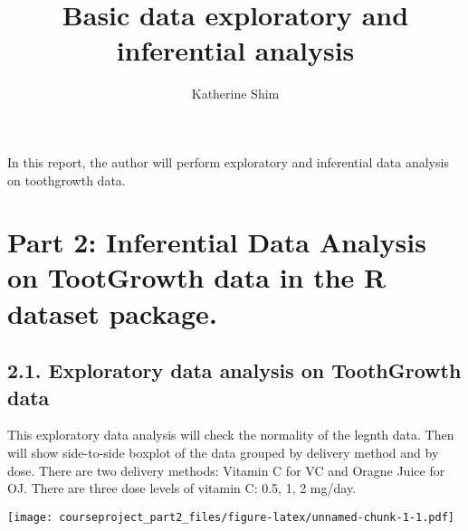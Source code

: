 \documentclass[]{article}
\title{Basic data exploratory and inferential analysis}
\author{Katherine Shim}
\date{}
\newenvironment{Shaded}{\begin{snugshade}}{\end{snugshade}}
\newcommand{\KeywordTok}[1]{\textcolor[rgb]{0.13,0.29,0.53}{\textbf{#1}}}
\newcommand{\DataTypeTok}[1]{\textcolor[rgb]{0.13,0.29,0.53}{#1}}
\newcommand{\StringTok}[1]{\textcolor[rgb]{0.31,0.60,0.02}{#1}}
\newcommand{\CommentTok}[1]{\textcolor[rgb]{0.56,0.35,0.01}{\textit{#1}}}
\newcommand{\OperatorTok}[1]{\textcolor[rgb]{0.81,0.36,0.00}{\textbf{#1}}}
\newcommand{\NormalTok}[1]{#1}
\begin{document}
\maketitle

In this report, the author will perform exploratory and inferential data
analysis on toothgrowth data.

\section{Part 2: Inferential Data Analysis on TootGrowth data in the R
dataset
package.}\label{part-2-inferential-data-analysis-on-tootgrowth-data-in-the-r-dataset-package.}

\subsection{2.1. Exploratory data analysis on ToothGrowth
data}\label{exploratory-data-analysis-on-toothgrowth-data}

This exploratory data analysis will check the normality of the legnth
data. Then will show side-to-side boxplot of the data grouped by
delivery method and by dose. There are two delivery methods: Vitamin C
for VC and Oragne Juice for OJ. There are three dose levels of vitamin
C: 0.5, 1, 2 mg/day.

\begin{Shaded}
\end{Shaded}

\texttt{[image: courseproject\_part2\_files/figure-latex/unnamed-chunk-1-1.pdf]}

\begin{Shaded}
\end{Shaded}
\end{document}
